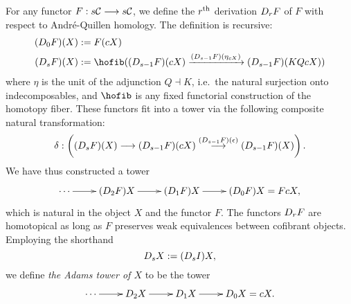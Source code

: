 \documentclass[11pt]{amsart}
\theoremstyle{plain}
\newcommand{\dupdown}[2]{D_{\smash{#1}}}
\begin{document}
For any functor $F:s\mathcal{C}\longrightarrow s\mathcal{C}$, we define the $r^\textup{th}$ derivation $\dupdown{r}{b}F$ of $F$ with respect to Andr\'e-Quillen homology. The definition is recursive:
\begin{alignat*}{2}
(\dupdown{0}{b}F)(X)
&:=
F(cX)%
\\
(\dupdown{s}{b}F)(X)
&:=
\hofib((\dupdown{s-1}{c}F)(cX)\xrightarrow{(\dupdown{s-1}{c}F)(\eta_{cX})} (\dupdown{s-1}{c}F)(KQcX))
\end{alignat*}
where $\eta$ is the unit of the adjunction $Q\dashv K$, i.e.\ the natural surjection onto indecomposables, and $\hofib$ is any fixed  functorial construction of the homotopy fiber. These functors fit into a tower via the following composite natural transformation:
\[\delta:\left((\dupdown{s}{c}F)(X)\to (\dupdown{s-1}{c}F)(cX)\overset{(\dupdown{s-1}{c}F)(\epsilon)}{\to} (\dupdown{s-1}{c}F)(X)\right).\]
We have thus constructed a tower
\[\xymatrix@R=4mm{
\cdots 
\ar[r]
&%
(\dupdown{2}{c}F)X
\ar[r]
&%
(\dupdown{1}{c}F)X
\ar[r]&%
(\dupdown{0}{c}F)X=FcX,
}\]
which is natural in the object $X$ and the functor $F$.
The functors $\dupdown{r}{c}F$ are homotopical as long as $F$ preserves weak equivalences between cofibrant objects. Employing the shorthand
\[\dupdown{s}{c}X:=(\dupdown{s}{c}I)X,\]
we define \emph{the Adams tower of $X$} to be the tower
\[\xymatrix@R=4mm{
\cdots 
\ar[r]
&%
\dupdown{2}{c}X
\ar[r]
&%
\dupdown{1}{c}X
\ar[r]&%
\dupdown{0}{c}X=cX.
}\]
\end{document}
